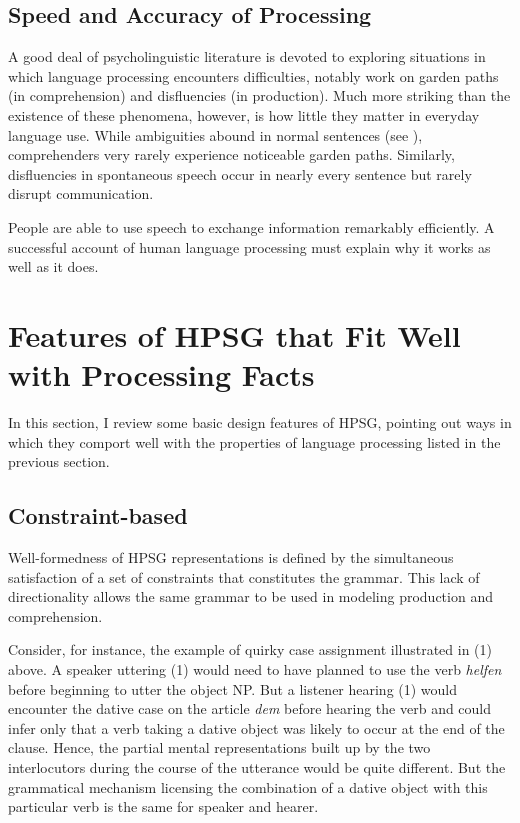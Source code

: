 \documentclass[a4paper]{article}
\begin{document}
\subsection{Speed and Accuracy of Processing}

A good deal of psycholinguistic literature is devoted to exploring situations in which language processing encounters difficulties, notably work on garden paths (in comprehension) and disfluencies (in production).  Much more striking than the existence of these phenomena, however, is how little they matter in everyday language use.  While ambiguities abound in normal sentences (see \citet{Wasow2015}), comprehenders very rarely experience noticeable garden paths.  Similarly, disfluencies in spontaneous speech occur in nearly every sentence but rarely disrupt communication.  

People are able to use speech to exchange information remarkably efficiently.  A successful account of human language processing must explain why it works as well as it does.  

\section{Features of HPSG that Fit Well with Processing Facts}

In this section, I review some basic design features of HPSG, pointing out ways in which they comport well with the properties of language processing listed in the previous section.

\subsection{Constraint-based}

Well-formedness of HPSG representations is defined by the simultaneous satisfaction of a set of constraints that constitutes the grammar.  This lack of directionality allows the same grammar to be used in modeling production and comprehension.

Consider, for instance, the example of quirky case assignment illustrated in (1) above.  A speaker uttering (1) would need to have planned to use the verb {\it helfen} before beginning to utter the object NP.  But a listener hearing (1) would encounter the dative case on the article {\it dem} before hearing the verb and could infer only that a verb taking a dative object was likely to occur at the end of the clause.  Hence, the partial mental representations built up by the two interlocutors during the course of the utterance would be quite different.  But the grammatical mechanism licensing the combination of a dative object with this particular verb is the same for speaker and hearer. 
\end{document}
